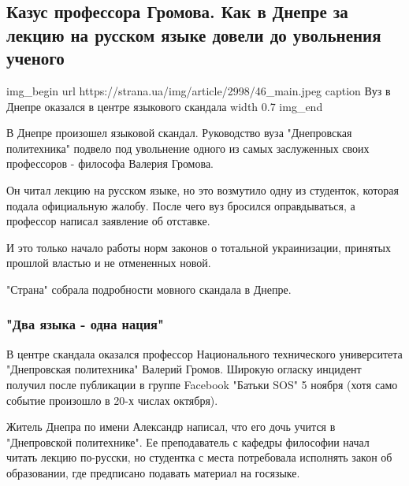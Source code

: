  
 
 

\subsection{Казус профессора Громова. Как в Днепре за лекцию на русском языке довели до увольнения ученого}

\ifcmt
img_begin 
	url https://strana.ua/img/article/2998/46_main.jpeg
	caption Вуз в Днепре оказался в центре языкового скандала 
	width 0.7
img_end
\fi

В Днепре произошел языковой скандал. Руководство вуза "Днепровская политехника"
подвело под увольнение одного из самых заслуженных своих профессоров - философа
Валерия Громова.

Он читал лекцию на русском языке, но это возмутило одну из студенток, которая
подала официальную жалобу. После чего вуз бросился оправдываться, а профессор
написал заявление об отставке. 

И это только начало работы норм законов о тотальной украинизации, принятых
прошлой властью и не отмененных новой. 

"Страна" собрала подробности мовного скандала в Днепре.

\subsubsection{"Два языка - одна нация"}

В центре скандала оказался профессор Национального технического университета
"Днепровская политехника" Валерий Громов. Широкую огласку инцидент получил
после публикации в группе Facebook "Батьки SOS" 5 ноября (хотя само событие
произошло в 20-х числах октября).

Житель Днепра по имени Александр написал, что его дочь учится в "Днепровской
политехнике". Ее преподаватель с кафедры философии начал читать лекцию
по-русски, но студентка с места потребовала исполнять закон об образовании, где
предписано подавать материал на госязыке.

